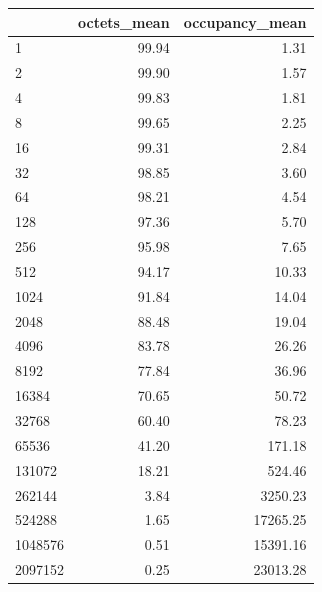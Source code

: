 \begin{tabular}{lrr}
\toprule
 & octets_mean & occupancy_mean \\
\midrule
1 & 99.94 & 1.31 \\
2 & 99.90 & 1.57 \\
4 & 99.83 & 1.81 \\
8 & 99.65 & 2.25 \\
16 & 99.31 & 2.84 \\
32 & 98.85 & 3.60 \\
64 & 98.21 & 4.54 \\
128 & 97.36 & 5.70 \\
256 & 95.98 & 7.65 \\
512 & 94.17 & 10.33 \\
1024 & 91.84 & 14.04 \\
2048 & 88.48 & 19.04 \\
4096 & 83.78 & 26.26 \\
8192 & 77.84 & 36.96 \\
16384 & 70.65 & 50.72 \\
32768 & 60.40 & 78.23 \\
65536 & 41.20 & 171.18 \\
131072 & 18.21 & 524.46 \\
262144 & 3.84 & 3250.23 \\
524288 & 1.65 & 17265.25 \\
1048576 & 0.51 & 15391.16 \\
2097152 & 0.25 & 23013.28 \\
\bottomrule
\end{tabular}
